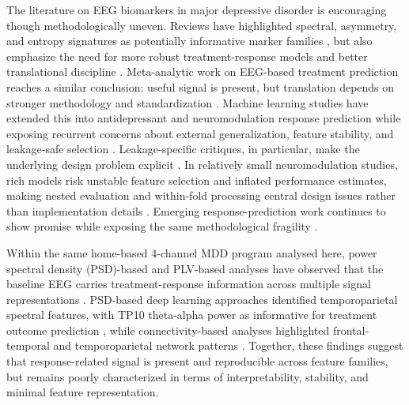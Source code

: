 The literature on EEG biomarkers in major depressive disorder is encouraging though methodologically uneven. Reviews have highlighted spectral, asymmetry, and entropy signatures as potentially informative marker families \citep{olbrich2013_eeg,olbrich2015_personalized,leuchter2010_biomarkers}, but also emphasize the need for more robust treatment-response models and better translational discipline \citep{Fu2019,Widge2019}. Meta-analytic work on EEG-based treatment prediction reaches a similar conclusion: useful signal is present, but translation depends on stronger methodology and standardization \citep{simmatis2023_technical,watts2022predicting,cohen2023electroencephalography}. Machine learning studies have extended this into antidepressant and neuromodulation response prediction while exposing recurrent concerns about external generalization, feature stability, and leakage-safe selection \citep{AlKaysi2017,jaworska2019_leveraging,oakley2022_eeg}. Leakage-specific critiques, in particular, make the underlying design problem explicit \citep{Shim2021,Shen2025}. In relatively small neuromodulation studies, rich models risk unstable feature selection and inflated performance estimates, making nested evaluation and within-fold processing central design issues rather than implementation details \citep{Widge2019,Shim2021}. Emerging response-prediction work continues to show promise while exposing the same methodological fragility \citep{guo2024_restingstate,Dagnino2023,ulrich2025_alterations}.

Within the same home-based 4-channel MDD program analysed here, power spectral density (PSD)-based and PLV-based analyses have observed that the baseline EEG carries treatment-response information across multiple signal representations \citep{Moncy2024,Xiao2025PMIP}. PSD-based deep learning approaches identified temporoparietal spectral features, with TP10 theta-alpha power as informative for treatment outcome prediction \citep{Moncy2024}, while connectivity-based analyses highlighted frontal-temporal and temporoparietal network patterns \citep{Xiao2025PMIP}. Together, these findings suggest that response-related signal is present and reproducible across feature families, but remains poorly characterized in terms of interpretability, stability, and minimal feature representation.

